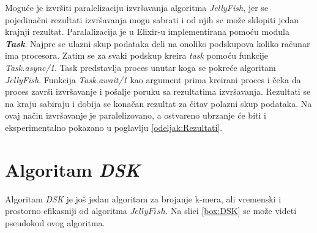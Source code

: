 \documentclass[12pt,oneside]{memoir}
\begin{document}


Moguće je izvršiti paralelizaciju izvršavanja algoritma \textit{JellyFish}, jer se pojedinačni rezultati izvršavanja mogu sabrati i od njih se može sklopiti jedan krajnji rezultat. Paralalizacija je u Elixir-u implementirana pomoću modula \textit{\textbf{Task}}. Najpre se ulazni skup podataka deli na onoliko podskupova koliko računar ima procesora. Zatim se za svaki podskup kreira \textit{task} pomoću funkcije \textit{Task.async/1}. Task predstavlja proces unutar koga se pokreće algoritam \textit{JellyFish}. Funkcija \textit{Task.await/1} kao argument prima kreirani proces i čeka da proces završi izvršavanje i pošalje poruku sa rezultatima izvršavanja. Rezultati se na kraju sabiraju i dobija se konačan rezultat za čitav polazni skup podataka. Na ovaj način izvršavanje je paralelizovano, a ostvareno ubrzanje će biti i eksperimentalno pokazano u poglavlju \ref{odeljak:Rezultati}.

\section{Algoritam \textit{DSK}}
\label{odeljak:DSK}

Algoritam \textit{DSK} je još jedan algoritam za brojanje k-mera, ali vremenski i prostorno efikasniji od algoritma $JellyFish$. Na slici \ref{box:DSK} se može videti pseudokod ovog algoritma.

\begin{comment}

\begin{figure}[h]
\centering
\texttt{[image: DSK5\_11.PNG]}
\caption{DSK algoritam \cite{WingKinSung}}
\label{fig:DSK}
\end{figure}

\end{comment}
\end{document}
